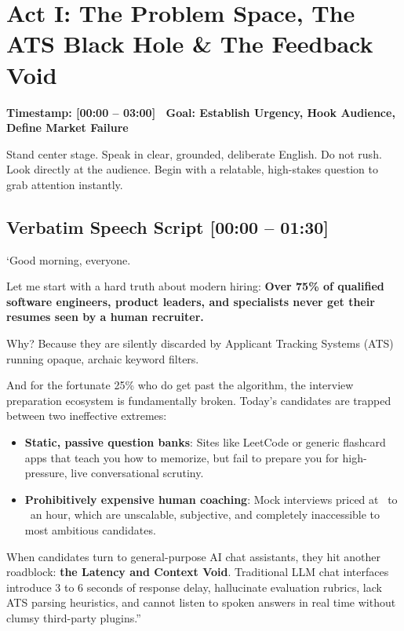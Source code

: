 \documentclass[11pt,a4paper]{article}
\begin{document}
\section{Act I: The Problem Space, The ATS Black Hole \& The Feedback Void}
\textcolor{accentyellow}{\textbf{Timestamp: [00:00 -- 03:00] \textbar\ Goal: Establish Urgency, Hook Audience, Define Market Failure}}

\begin{speakercue}{Stand center stage. Speak in clear, grounded, deliberate English. Do not rush.}
Look directly at the audience. Begin with a relatable, high-stakes question to grab attention instantly.
\end{speakercue}

\subsection{Verbatim Speech Script [00:00 -- 01:30]}
`Good morning, everyone. 

Let me start with a hard truth about modern hiring: \textbf{Over 75\% of qualified software engineers, product leaders, and specialists never get their resumes seen by a human recruiter.} 

Why? Because they are silently discarded by Applicant Tracking Systems (ATS) running opaque, archaic keyword filters. 

And for the fortunate 25\% who do get past the algorithm, the interview preparation ecosystem is fundamentally broken. Today's candidates are trapped between two ineffective extremes:
\begin{itemize}[leftmargin=*]
    \item \textbf{Static, passive question banks}: Sites like LeetCode or generic flashcard apps that teach you how to memorize, but fail to prepare you for high-pressure, live conversational scrutiny.
    \item \textbf{Prohibitively expensive human coaching}: Mock interviews priced at \ to \ an hour, which are unscalable, subjective, and completely inaccessible to most ambitious candidates.
\end{itemize}

When candidates turn to general-purpose AI chat assistants, they hit another roadblock: \textbf{the Latency and Context Void}. Traditional LLM chat interfaces introduce 3 to 6 seconds of response delay, hallucinate evaluation rubrics, lack ATS parsing heuristics, and cannot listen to spoken answers in real time without clumsy third-party plugins.''
\end{document}
